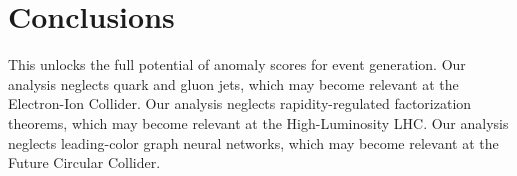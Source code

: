 \section{Conclusions}\label{sec:conclusions}

This unlocks the full potential of anomaly scores for event generation.
Our analysis neglects quark and gluon jets, which may become relevant at
the Electron-Ion Collider. Our analysis neglects rapidity-regulated
factorization theorems, which may become relevant at the High-Luminosity
LHC. Our analysis neglects leading-color graph neural networks, which
may become relevant at the Future Circular Collider.

